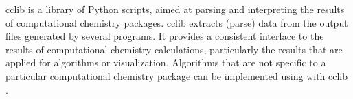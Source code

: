 cclib is a library of Python scripts, aimed at parsing and interpreting the results of computational chemistry packages. cclib extracts (parse) data from the output files generated by several programs. It provides a consistent interface to the results of computational chemistry calculations, particularly the results that are applied for algorithms or visualization. Algorithms that are not specific to a particular computational chemistry package can be implemented using with cclib \cite{O_boyle_2008}. 